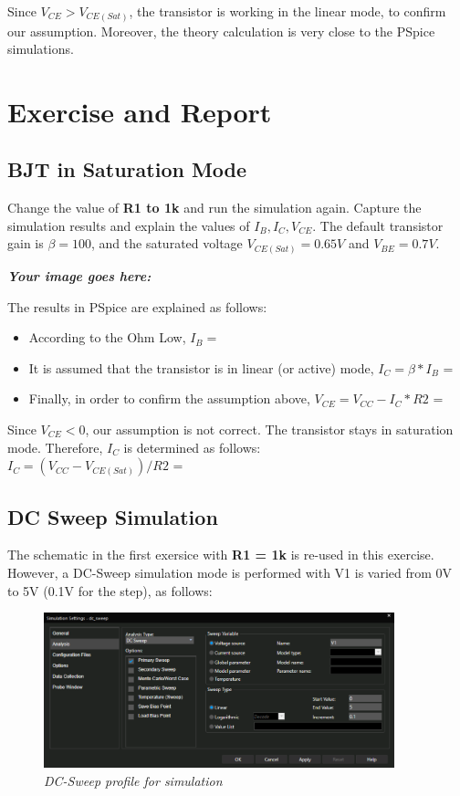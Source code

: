 Since $V_{CE} > V_{CE(Sat)}$, the transistor is working in the linear mode, to confirm our assumption. Moreover, the theory calculation is very close to the PSpice simulations.

\section{Exercise and Report}
\subsection{BJT in Saturation Mode}
Change the value of \textbf{R1 to 1k} and run the simulation again. Capture the simulation results and explain the values of $I_B, I_C, V_{CE}$. The default transistor gain is $\beta = 100$, and the saturated voltage $V_{CE(Sat)} = 0.65V$ and $V_{BE} = 0.7V$.


\textbf{\textit{Your image goes here:}}\\
\vspace{6cm}

The results in PSpice are explained as follows:

\begin{itemize}
    \item According to the Ohm Low, $I_B =$ \dotfill
    \item It is assumed that the transistor is in linear (or active) mode, $I_C = \beta * I_B$ = \dotfill
    \item Finally, in order to confirm the assumption above, $V_{CE} = V_{CC} - I_C*R2$ = \dotfill
\end{itemize}

Since $V_{CE} < 0$, our assumption is not correct. The transistor stays in saturation mode. Therefore, $I_C$ is determined as follows:\\

$I_C = (V_{CC} - V_{CE(Sat)}) / R2$ = \dotfill\\

\newpage
\subsection{DC Sweep Simulation}
The schematic in the first exersice with \textbf{R1 = 1k} is re-used in this exercise. However, a DC-Sweep simulation mode is performed with V1 is varied from 0V to 5V (0.1V for the step), as follows:

\begin{figure}[!htp]
    \centering
    \includegraphics[width=4in]{source/picture/bai_3/dc_sweep_simul.PNG}
    \caption{\textit{DC-Sweep profile for simulation}}
    \label{bai3_manual_2}
\end{figure}

